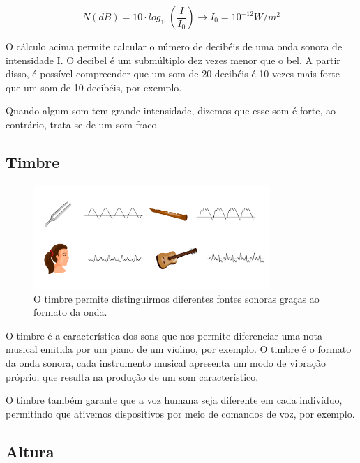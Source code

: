 \documentclass[
	article,		
	11pt,			
	oneside,		
	a4paper,			
	english,			
	brazil			
]{abntex2}
\begin{document}
\begin{equation}
    N(dB) = 10 \cdot log_{10} (\frac{I}{I_0}) \rightarrow I_0 = 10^{-12} W/m^2
\end{equation}

O cálculo acima permite calcular o número de decibéis de uma onda sonora de intensidade I. O decibel é um submúltiplo dez vezes menor que o bel. A partir disso, é possível compreender que um som de 20 decibéis é 10 vezes mais forte que um som de 10 decibéis, por exemplo.

Quando algum som tem grande intensidade, dizemos que esse som é forte, ao contrário, trata-se de um som fraco.

\subsection{Timbre}

\begin{figure}[h]
    \includegraphics[width=0.80\textwidth]{timbre.jpg}
    \centering
    \caption{O timbre permite distinguirmos diferentes fontes sonoras graças ao formato da onda.}
    \label{fig:Timbre}
\end{figure}

O timbre é a característica dos sons que nos permite diferenciar uma nota musical emitida por um piano de um violino, por exemplo. O timbre é o formato da onda sonora, cada instrumento musical apresenta um modo de vibração próprio, que resulta na produção de um som característico.

O timbre também garante que a voz humana seja diferente em cada indivíduo, permitindo que ativemos dispositivos por meio de comandos de voz, por exemplo.

\subsection{Altura}
\end{document}
